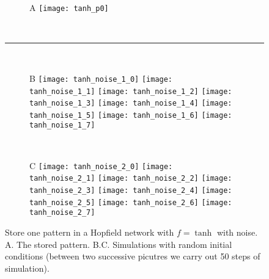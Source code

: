 \begin{figure}[H]
  \centering
  \begin{subfigure}{\textwidth}
    \hspace{0.6em}
    \textsf{A}
    \texttt{[image: tanh\_p0]}
  \end{subfigure}\\[1em]
  \hspace*{1.2em}\rule{0.95\textwidth}{1.8pt}\\[1em]
  \begin{subfigure}{\textwidth}
    \hspace{0.6em}
    \textsf{B}
    \texttt{[image: tanh\_noise\_1\_0]}
    \texttt{[image: tanh\_noise\_1\_1]}
    \texttt{[image: tanh\_noise\_1\_2]}
    \texttt{[image: tanh\_noise\_1\_3]}
    \texttt{[image: tanh\_noise\_1\_4]}
    \texttt{[image: tanh\_noise\_1\_5]}
    \texttt{[image: tanh\_noise\_1\_6]}
    \texttt{[image: tanh\_noise\_1\_7]}
  \end{subfigure}\\[0.6em]
  \begin{subfigure}{\textwidth}
    \hspace{0.6em}
    \textsf{C}
    \texttt{[image: tanh\_noise\_2\_0]}
    \texttt{[image: tanh\_noise\_2\_1]}
    \texttt{[image: tanh\_noise\_2\_2]}
    \texttt{[image: tanh\_noise\_2\_3]}
    \texttt{[image: tanh\_noise\_2\_4]}
    \texttt{[image: tanh\_noise\_2\_5]}
    \texttt{[image: tanh\_noise\_2\_6]}
    \texttt{[image: tanh\_noise\_2\_7]}
  \end{subfigure}
  \vspace{1.2em}
  \caption{Store one pattern in a Hopfield network with $f = \tanh$ 
           with noise.
           \textsf{A.} The stored pattern.
           \textsf{B.C.} Simulations with random initial conditions
           (between two successive picutres we carry out 50 steps of
           simulation).}
  \label{fig: Hopfield_tanh_noise}

\end{figure}

\vfill

